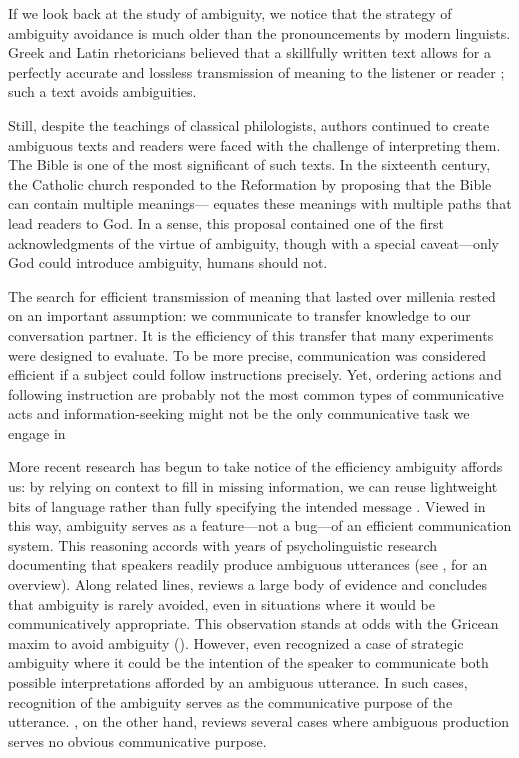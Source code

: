 \documentclass[10pt,a4paper]{article}
\newcommand{\gcs}[1]{\textcolor{blue}{[gcs: #1]}}
\begin{document}
If we look back at the study of ambiguity, we notice that the strategy of ambiguity avoidance is much older than the pronouncements by modern linguists. Greek and Latin rhetoricians believed that a skillfully written text allows for a perfectly accurate and lossless transmission of meaning to the listener or reader \cite{ossarichardson2019}; such a text avoids ambiguities.

Still, despite the teachings of classical philologists, authors continued to  create ambiguous texts and readers were faced with the challenge of interpreting them. The Bible is one of the most significant of such texts. In the sixteenth century, the Catholic church responded to the Reformation by proposing that the Bible can contain multiple meanings--- equates these meanings with multiple paths that lead readers to God. In a sense, this proposal contained one of the first acknowledgments of the virtue of ambiguity, though with a  special caveat---only God could introduce ambiguity, humans should not. 

The search for efficient transmission of meaning that lasted over millenia rested on an important assumption: we communicate to transfer knowledge to our conversation partner. It is the efficiency of this transfer that many experiments were designed to evaluate. To be more precise, communication was considered efficient if a subject could follow instructions precisely. Yet, ordering actions and following instruction are probably not  the most common types of communicative acts \cite{foppa1995mutual} and information-seeking might not be the only communicative task we engage in \cite{markova1995preface}

More recent research has begun to take notice of the efficiency ambiguity affords us: by relying on context to fill in missing information, we can reuse lightweight bits of language rather than fully specifying the intended message \cite{levinson2000,piantadosietal2012,wasow2015}. 
Viewed in this way, ambiguity serves as a feature---not a bug---of an efficient communication system.
This reasoning accords with years of psycholinguistic research documenting that speakers readily produce ambiguous utterances (see , for an overview). 
Along related lines,  reviews a large body of evidence and concludes that ambiguity is rarely avoided, even in situations where it would be communicatively appropriate.
This observation stands at odds with the Gricean maxim to avoid ambiguity ().
However, even  recognized a case of strategic ambiguity where it could be the intention of the speaker to communicate both possible interpretations afforded by an ambiguous utterance. In such cases, recognition of the ambiguity serves as the communicative purpose of the utterance. , on the other hand, reviews several cases where ambiguous production serves no obvious communicative purpose.
\end{document}
